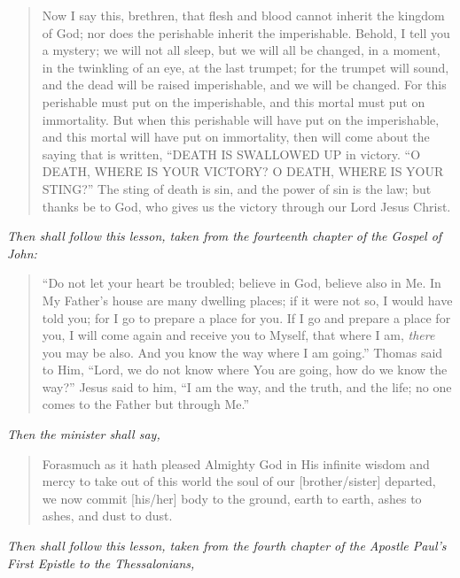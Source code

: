 \documentclass[
]{book}
\begin{document}
\begin{quote}
Now I say this, brethren, that flesh and blood cannot inherit the kingdom of God; nor does the perishable inherit the imperishable. Behold, I tell you a mystery; we will not all sleep, but we will all be changed, in a moment, in the twinkling of an eye, at the last trumpet; for the trumpet will sound, and the dead will be raised imperishable, and we will be changed. For this perishable must put on the imperishable, and this mortal must put on immortality. But when this perishable will have put on the imperishable, and this mortal will have put on immortality, then will come about the saying that is written, ``DEATH IS SWALLOWED UP in victory. ``O DEATH, WHERE IS YOUR VICTORY? O DEATH, WHERE IS YOUR STING?'' The sting of death is sin, and the power of sin is the law; but thanks be to God, who gives us the victory through our Lord Jesus Christ.
\end{quote}

\begin{center}
\emph{Then shall follow this lesson, taken from the fourteenth chapter of the Gospel of John:}

\end{center}

\begin{quote}
``Do not let your heart be troubled; believe in God, believe also in Me. In My Father's house are many dwelling places; if it were not so, I would have told you; for I go to prepare a place for you. If I go and prepare a place for you, I will come again and receive you to Myself, that where I am, \emph{there} you may be also. And you know the way where I am going.'' Thomas said to Him, ``Lord, we do not know where You are going, how do we know the way?'' Jesus said to him, ``I am the way, and the truth, and the life; no one comes to the Father but through Me.''
\end{quote}

\begin{center}
\emph{Then the minister shall say,}

\end{center}

\begin{quote}
Forasmuch as it hath pleased Almighty God in His infinite wisdom and mercy to take out of this world the soul of our {[}brother/sister{]} departed, we now commit {[}his/her{]} body to the ground, earth to earth, ashes to ashes, and dust to dust.
\end{quote}

\begin{center}
\emph{Then shall follow this lesson, taken from the fourth chapter of the Apostle Paul's First Epistle to the Thessalonians,}

\end{center}
\end{document}
